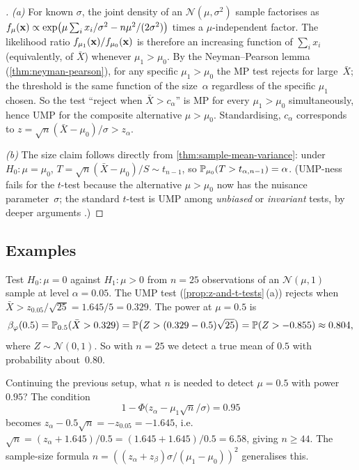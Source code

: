 \begin{proof}[]
\emph{(a)} For known $\sigma$, the joint density of an
$\mathcal{N}(\mu, \sigma^2)$ sample factorises as
$f_\mu(\mathbf{x}) \propto \exp\bigl(\mu \sum_i x_i / \sigma^2 - n \mu^2 / (2 \sigma^2)\bigr)$
times a $\mu$-independent factor. The likelihood ratio
$f_{\mu_1}(\mathbf{x})/f_{\mu_0}(\mathbf{x})$ is therefore an increasing
function of $\sum_i x_i$ (equivalently, of $\bar X$) whenever
$\mu_1 > \mu_0$. By the Neyman--Pearson lemma
(\cref{thm:neyman-pearson}), for any specific $\mu_1 > \mu_0$ the
MP test rejects for large~$\bar X$; the threshold is the same
function of the size~$\alpha$ regardless of the specific $\mu_1$
chosen. So the test ``reject when $\bar X > c_\alpha$'' is MP for
every $\mu_1 > \mu_0$ simultaneously, hence UMP for the composite
alternative $\mu > \mu_0$. Standardising, $c_\alpha$ corresponds
to $z = \sqrt n (\bar X - \mu_0)/\sigma > z_\alpha$.

\emph{(b)} The size claim follows directly from
\cref{thm:sample-mean-variance}: under $H_0 : \mu = \mu_0$,
$T = \sqrt n (\bar X - \mu_0)/S \sim t_{n - 1}$, so
$\mathbb{P}_{\mu_0}(T > t_{\alpha, n - 1}) = \alpha$. (UMP-ness fails
for the $t$-test because the alternative $\mu > \mu_0$ now has the
nuisance parameter~$\sigma$; the standard $t$-test is UMP among
\emph{unbiased} or \emph{invariant} tests, by deeper arguments
\cite[Ch.~VII]{Shiryaev1989}.)
\end{proof}

\subsection*{Examples}

\begin{example}
\label{ex:z-test-power}
Test $H_0 : \mu = 0$ against $H_1 : \mu > 0$ from $n = 25$
observations of an $\mathcal{N}(\mu, 1)$ sample at level
$\alpha = 0.05$. The UMP test (\cref{prop:z-and-t-tests}\,(a))
rejects when $\bar X > z_{0.05}/\sqrt{25} = 1.645/5 = 0.329$. The
power at $\mu = 0.5$ is
\[
  \beta_\varphi(0.5) = \mathbb{P}_{0.5}(\bar X > 0.329) = \mathbb{P}\bigl(Z > (0.329 - 0.5)\sqrt{25}\bigr) = \mathbb{P}(Z > -0.855) \approx 0.804,
\]
where $Z \sim \mathcal{N}(0, 1)$. So with $n = 25$ we detect a true
mean of $0.5$ with probability about~$0.80$.
\end{example}

\begin{example}
\label{ex:sample-size}
Continuing the previous setup, what $n$ is needed to detect
$\mu = 0.5$ with power~$0.95$? The condition
\[
  1 - \Phi\bigl(z_\alpha - \mu_1 \sqrt n / \sigma\bigr) = 0.95
\]
becomes $z_\alpha - 0.5 \sqrt n = -z_{0.05} = -1.645$, i.e.\
$\sqrt n = (z_\alpha + 1.645)/0.5 = (1.645 + 1.645)/0.5 = 6.58$,
giving $n \geq 44$. The sample-size formula
$n = ((z_\alpha + z_\beta)\sigma/(\mu_1 - \mu_0))^2$ generalises this.
\end{example}

